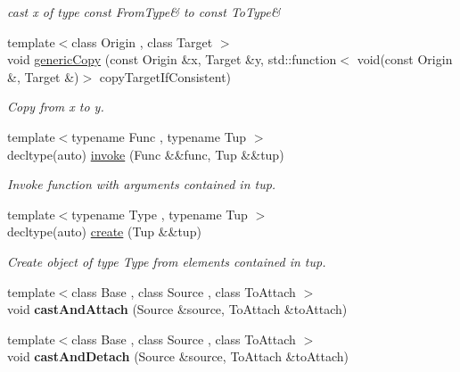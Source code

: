 \begin{DoxyCompactItemize}
\begin{DoxyCompactList}\small\item\em cast x of type \textquotesingle{}const From\+Type\&\textquotesingle{} to \textquotesingle{}const To\+Type\&\textquotesingle{} \end{DoxyCompactList}\item 
{\footnotesize template$<$class Origin , class Target $>$ }\\void \hyperlink{namespaceSpacy_a7dd8ce352c45e326cf8966befd5159ce}{generic\+Copy} (const Origin \&x, Target \&y, std\+::function$<$ void(const Origin \&, Target \&)$>$ copy\+Target\+If\+Consistent)
\begin{DoxyCompactList}\small\item\em Copy from x to y. \end{DoxyCompactList}\item 
{\footnotesize template$<$typename Func , typename Tup $>$ }\\decltype(auto) \hyperlink{namespaceSpacy_a64250818ba7ff711c207af6ab40ff986}{invoke} (Func \&\&func, Tup \&\&tup)
\begin{DoxyCompactList}\small\item\em Invoke function with arguments contained in tup. \end{DoxyCompactList}\item 
{\footnotesize template$<$typename Type , typename Tup $>$ }\\decltype(auto) \hyperlink{namespaceSpacy_ae823c82326475d3cc3b166533deddf21}{create} (Tup \&\&tup)
\begin{DoxyCompactList}\small\item\em Create object of type Type from elements contained in tup. \end{DoxyCompactList}\item 
{\footnotesize template$<$class Base , class Source , class To\+Attach $>$ }\\void {\bfseries cast\+And\+Attach} (Source \&source, To\+Attach \&to\+Attach)\hypertarget{namespaceSpacy_accc9a8a0cad11b10fb4453e6bea7a7e1}{}\label{namespaceSpacy_accc9a8a0cad11b10fb4453e6bea7a7e1}

\item 
{\footnotesize template$<$class Base , class Source , class To\+Attach $>$ }\\void {\bfseries cast\+And\+Detach} (Source \&source, To\+Attach \&to\+Attach)\hypertarget{namespaceSpacy_a9e6018674d6169a33a2fa75a35e2fef3}{}\label{namespaceSpacy_a9e6018674d6169a33a2fa75a35e2fef3}


\end{DoxyCompactItemize}
